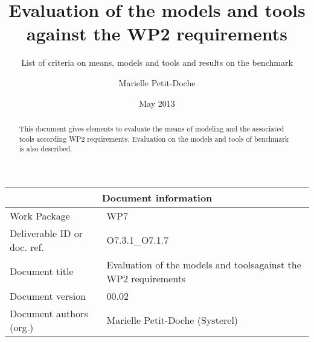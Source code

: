 \documentclass{template/openetcs_report}
\begin{document}
\frontmatter
{}




\title{Evaluation of the models and tools against the WP2 requirements }

\subtitle{List of criteria on means, models and tools and results on the benchmark}

\date{May 2013}


\author{Marielle Petit-Doche}

 


\begin{abstract}
This document gives elements to evaluate the means of modeling and the associated tools according WP2 requirements. Evaluation on the models and tools of benchmark is also described.

\end{abstract}

\maketitle
\tableofcontents
\listoffiguresandtables
\newpage


\begin{tabular}{|p{4.4cm}|p{8.7cm}|}
\hline
\multicolumn{2}{|c|}{Document information} \\
\hline
Work Package &  WP7  \\
Deliverable ID or doc. ref. & O7.3.1\_O7.1.7\\
\hline
Document title & Evaluation of the models and toolsagainst the WP2 requirements \\
Document version & 00.02 \\
Document authors (org.)  & Marielle Petit-Doche (Systerel)  \\
\hline
\end{tabular}
\end{document}
